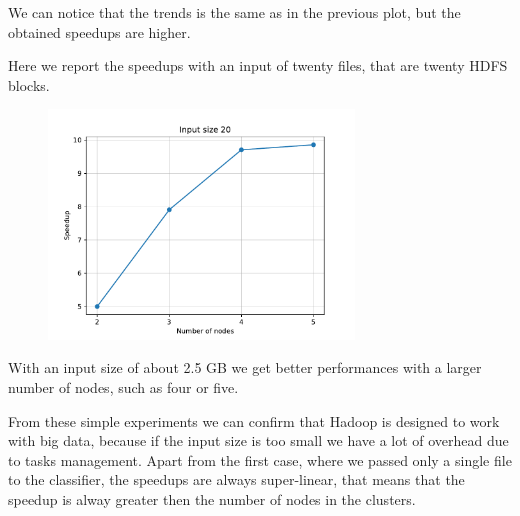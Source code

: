 \documentclass[10pt,twocolumn,letterpaper]{article}
\begin{document}
We can notice that the trends is the same as in the previous plot, but the obtained speedups are higher.

Here we report the speedups with an input of twenty files, that are twenty HDFS blocks.

\begin{figure}[H]
\centering
\includegraphics[width=3.2in]{fig/speedup20}
\end{figure}

With an input size of about 2.5 GB we get better performances with a larger number of nodes, such as four or five.

From these simple experiments we can confirm that Hadoop is designed to work with big data, because if the input size is too small we have a lot of overhead due to tasks management. Apart from the first case, where we passed only a single file to the classifier, the speedups are always super-linear, that means that the speedup is alway greater then the number of nodes in the clusters.
\end{document}
